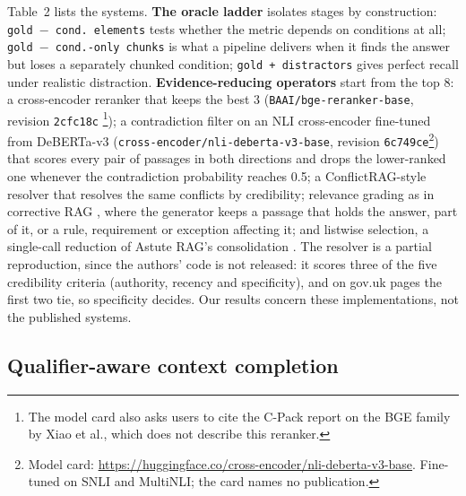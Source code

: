 Table~2 lists the systems. \textbf{The oracle ladder} isolates stages by construction: \texttt{gold\,$-$\,cond.\ elements} tests whether the metric depends on conditions at all; \texttt{gold\,$-$\,cond.-only chunks} is what a pipeline delivers when it finds the answer but loses a separately chunked condition; \texttt{gold\,+\,distractors} gives perfect recall under realistic distraction. \textbf{Evidence-reducing operators} start from the top 8: a cross-encoder reranker that keeps the best 3 (\texttt{BAAI/bge-reranker-base}, revision \texttt{2cfc18c} \cite{baai2023bgereranker}\footnote{The model card also asks users to cite the C-Pack report on the BGE family by Xiao et al., which does not describe this reranker.}); a contradiction filter on an NLI cross-encoder fine-tuned from DeBERTa-v3 \cite{he2023debertav3} (\texttt{cross-encoder/nli-deberta-v3-base}, revision \texttt{6c749ce}\footnote{Model card: \url{https://huggingface.co/cross-encoder/nli-deberta-v3-base}. Fine-tuned on SNLI and MultiNLI; the card names no publication.}) that scores every pair of passages in both directions and drops the lower-ranked one whenever the contradiction probability reaches 0.5; a ConflictRAG-style resolver \cite{conflictrag2026} that resolves the same conflicts by credibility; relevance grading as in corrective RAG \cite{yan2024crag}, where the generator keeps a passage that holds the answer, part of it, or a rule, requirement or exception affecting it; and listwise selection, a single-call reduction of Astute RAG's consolidation \cite{wang2025astute}. The resolver is a partial reproduction, since the authors' code is not released: it scores three of the five credibility criteria (authority, recency and specificity), and on gov.uk pages the first two tie, so specificity decides. Our results concern these implementations, not the published systems.



\subsection{Qualifier-aware context completion}


